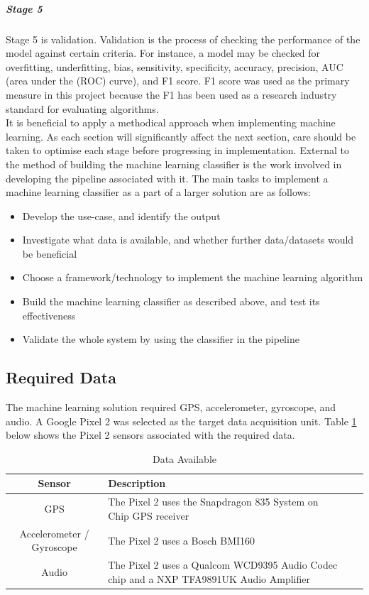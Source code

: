 \documentclass{UoNMCHA}
\newcommand{\tref}[1] {Table \ref{#1}}
\numberwithin{equation}{section}
\begin{document}
\subparagraph{Stage 5}
Stage 5 is validation. Validation is the process of checking the performance of the model against certain criteria. For instance, a model may be checked for overfitting, underfitting, bias, sensitivity, specificity, accuracy, precision, AUC (area under the (ROC) curve), and F1 score. F1 score was used as the primary measure in this project because the F1 has been used as a research industry standard for evaluating algorithms. \\

It is beneficial to apply a methodical approach when implementing machine learning. As each section will significantly affect the next section, care should be taken to optimise each stage before progressing in implementation. External to the method of building the machine learning classifier is the work involved in developing the pipeline associated with it. The main tasks to implement a machine learning classifier as a part of a larger solution are as follows:

\begin{itemize}
    \item Develop the use-case, and identify the output
    \item Investigate what data is available, and whether further data/datasets would be beneficial
    \item Choose a framework/technology to implement the machine learning algorithm
    \item Build the machine learning classifier as described above, and test its effectiveness
    \item Validate the whole system by using the classifier in the pipeline %
\end{itemize}

\subsection{Required Data}
The machine learning solution required GPS, accelerometer, gyroscope, and audio. A Google Pixel 2 was selected as the target data acquisition unit. \tref{tab:AndroidSensorsAvailable} below shows the Pixel 2 sensors associated with the required data.
\begin{table}[h!] 
    \begin{center}
        \caption{Data Available \cite{pixelteardown}}\label{tab:AndroidSensorsAvailable}
        {\footnotesize
            \begin{tabular}{clll}
                \hline\hline Sensor & Description \\ \hline 
                GPS & The Pixel 2 uses the Snapdragon 835 System on Chip GPS receiver\\
                Accelerometer / Gyroscope & The Pixel 2 uses a Bosch BMI160 \\
                    Audio & {\scriptsize The Pixel 2 uses a Qualcom WCD9395 Audio Codec chip and a NXP TFA9891UK Audio Amplifier} \\ \hline
            \end{tabular}
        }
    \end{center}
\end{table}
\end{document}
